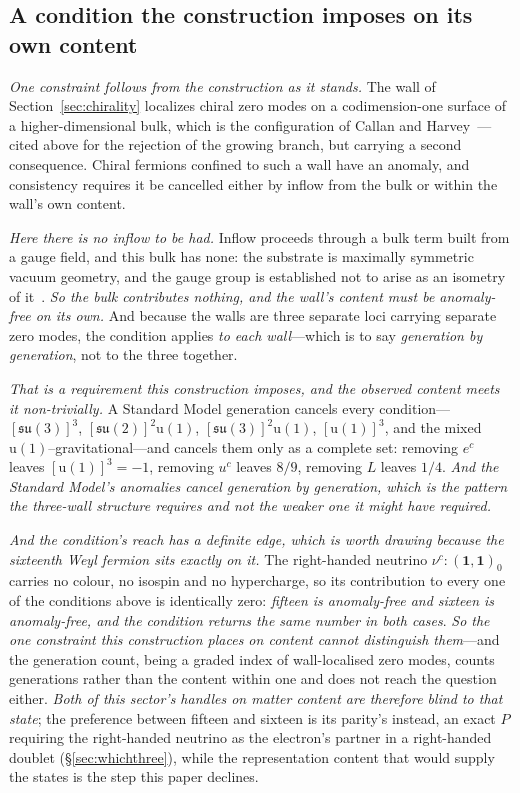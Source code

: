 \documentclass[11pt]{article}
\newcommand{\su}{\mathfrak{su}}
\begin{document}
\subsection{A condition the construction imposes on its own content}\label{sec:inflow}

\emph{One constraint follows from the construction as it stands.} The wall of
Section~\ref{sec:chirality} localizes chiral zero modes on a codimension-one surface of a higher-dimensional
bulk, which is the configuration of Callan and Harvey~\cite{CallanHarvey1985}---cited above for the rejection
of the growing branch, but carrying a second consequence. Chiral fermions confined to such a wall have an
anomaly, and consistency requires it be cancelled either by inflow from the bulk or within the wall's own
content.

\emph{Here there is no inflow to be had.} Inflow proceeds through a bulk term built from a gauge field, and this
bulk has none: the substrate is maximally symmetric vacuum geometry, and the gauge group is established not to
arise as an isometry of it~\cite{JanzenBoundary}. \emph{So the bulk contributes nothing, and the wall's content
must be anomaly-free on its own.} And because the walls are three separate loci carrying separate zero modes,
the condition applies \emph{to each wall}---which is to say \emph{generation by generation}, not to the three
together.

\emph{That is a requirement this construction imposes, and the observed content meets it non-trivially.} A
Standard Model generation cancels every condition---$[\su(3)]^{3}$, $[\su(2)]^{2}\mathrm{u}(1)$,
$[\su(3)]^{2}\mathrm{u}(1)$, $[\mathrm{u}(1)]^{3}$, and the mixed $\mathrm{u}(1)$--gravitational---and cancels
them only as a complete set: removing $e^{c}$ leaves $[\mathrm{u}(1)]^{3}=-1$, removing $u^{c}$ leaves $8/9$,
removing $L$ leaves $1/4$. \emph{And the Standard Model's anomalies cancel generation
by generation, which is the pattern the three-wall structure requires and not the weaker one it might have
required.}

\emph{And the condition's reach has a definite edge, which is worth drawing because the sixteenth Weyl
fermion sits exactly on it.} The right-handed neutrino $\nu^{c}:(\mathbf{1},\mathbf{1})_{0}$ carries no
colour, no isospin and no hypercharge, so its contribution to every one of the conditions above is
identically zero: \emph{fifteen is anomaly-free and sixteen is anomaly-free, and the condition returns the
same number in both cases}. \emph{So the one
constraint this construction places on content cannot distinguish them}---and the generation count, being a
graded index of wall-localised zero modes, counts generations rather than the content within one and does not
reach the question either. \emph{Both of this sector's handles on matter content are therefore blind to that
state}; the preference between fifteen and sixteen is its parity's instead, an exact $P$ requiring the
right-handed neutrino as the electron's partner in a right-handed doublet (\S\ref{sec:whichthree}), while the
representation content that would supply the states is the step this paper declines.
\end{document}
